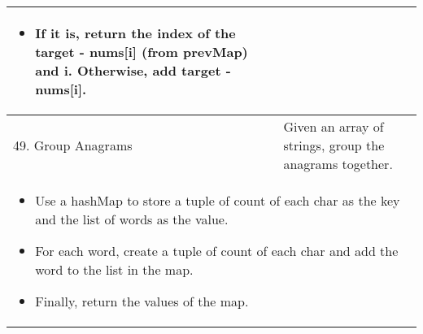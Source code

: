 \begin{summary}
\begin{center}
\begin{tabular}{ll}
{\begin{itemize}
\begin{itemize}
                        \item If it is, return the index of the target - nums[i] (from prevMap) and i. Otherwise, add target - nums[i].
                    \end{itemize}
                \end{itemize}
            } \\
            \midrule
            49. Group Anagrams & Given an array of strings, group the anagrams together. \\
            \multicolumn{2}{p{\linewidth}}{
                \begin{itemize}
                    \item Use a hashMap to store a tuple of count of each char as the key and the list of words as the value.
                    \item For each word, create a tuple of count of each char and add the word to the list in the map.
                    \item Finally, return the values of the map.
                \end{itemize}
            } \\
            \bottomrule
        \end{tabular}
    \end{center}
\end{summary}